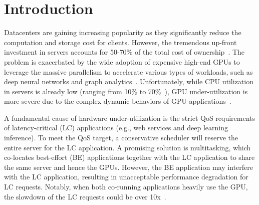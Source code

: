 
\section{Introduction}
\vspace{-.2cm}
Datacenters are gaining increasing popularity as they significantly reduce the computation and storage 
cost for clients. However, the tremendous up-front investment in servers accounts 
for 50-70\% of the total cost of ownership~\cite{datacenter_cost}. 
The problem is exacerbated by the wide adoption of expensive high-end GPUs to 
leverage the massive parallelism to accelerate various types of workloads, 
such as deep neural networks %
and graph analytics~\cite{Wang:PPoPP2015,Han:PACT2017}. 
Unfortunately, while CPU utilization in servers is already low (ranging from 10\% to 70\%~\cite{Lo:ISCA2014}), GPU under-utilization is more severe due to the complex dynamic behaviors of GPU applications~\cite{Chen+:ASPLOS16}.

A fundamental cause of hardware under-utilization is the strict QoS requirements of latency-critical (LC) applications (e.g., web services and deep learning inference). %
To meet the QoS target, a conservative scheduler will reserve the entire server for the LC application. A promising solution is multitasking, which co-locates best-effort (BE) applications together with the LC application to share the same server and hence the GPUs. However, the BE application may interfere with the LC application, resulting in unacceptable performance degradation for LC requests. Notably, when both co-running applications heavily use the GPU, the slowdown of the LC requests could be over 10x~\cite{Chen:ASPLOS2017,Wu:ASPLOS2017}.


